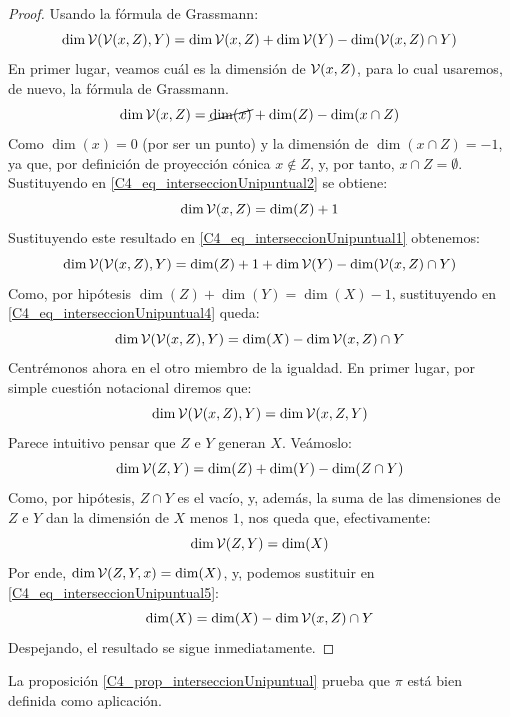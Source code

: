 \begin{proof}
	Usando la fórmula de Grassmann:
	\begin{equation}
		\label{C4_eq_interseccionUnipuntual1}
		\dim\mathcal{V}(\mathcal{V}(x,Z),Y)=\dim\mathcal{V}(x,Z)+\dim\mathcal{V}(Y)-\dim(\mathcal{V}(x,Z)\cap Y)
	\end{equation}
	En primer lugar, veamos cuál es la dimensión de $\mathcal{V}(x,Z)$, para lo cual usaremos, de nuevo, la fórmula de Grassmann.
	\begin{equation}
		\label{C4_eq_interseccionUnipuntual2}
		\dim\mathcal{V}(x,Z)=\cancel{\dim(x)}+\dim(Z)-\dim(x\cap Z)
	\end{equation}
	Como $\dim(x)=0$ (por ser un punto) y la dimensión de $\dim(x\cap Z)=-1$, ya que, por definición de proyección cónica $x\not\in Z$, y, por tanto, $x\cap Z=\emptyset$. Sustituyendo en \eqref{C4_eq_interseccionUnipuntual2} se obtiene:
	\begin{equation}
		\label{C4_eq_interseccionUnipuntual3}
		\dim\mathcal{V}(x,Z)=\dim(Z)+1
	\end{equation}
	Sustituyendo este resultado en \eqref{C4_eq_interseccionUnipuntual1} obtenemos:
	\begin{equation}
		\label{C4_eq_interseccionUnipuntual4}
		\dim\mathcal{V}(\mathcal{V}(x,Z),Y)=\dim(Z)+1+\dim\mathcal{V}(Y)-\dim(\mathcal{V}(x,Z)\cap Y)
	\end{equation}
	Como, por hipótesis $\dim(Z)+\dim(Y)=\dim(X)-1$, sustituyendo en \eqref{C4_eq_interseccionUnipuntual4} queda:
	\begin{equation}
		\label{C4_eq_interseccionUnipuntual5}
		\dim\mathcal{V}(\mathcal{V}(x,Z),Y)=\dim(X)-\dim\mathcal{V}(x,Z)\cap Y
	\end{equation}
	Centrémonos ahora en el otro miembro de la igualdad. En primer lugar, por simple cuestión notacional diremos que:
	\[\dim\mathcal{V}(\mathcal{V}(x,Z),Y)=\dim\mathcal{V}(x,Z,Y)\]
	Parece intuitivo pensar que $Z$ e $Y$ generan $X$. Veámoslo:
	\begin{equation}
		\label{C4_eq_interseccionUnipuntual6}
		\dim\mathcal{V}(Z,Y)=\dim(Z)+\dim(Y)-\dim(Z\cap Y)
	\end{equation}
	Como, por hipótesis, $Z\cap Y$ es el vacío, y, además, la suma de las dimensiones de $Z$ e $Y$ dan la dimensión de $X$ menos $1$, nos queda que, efectivamente:
	\begin{equation}
		\label{C4_eq_interseccionUnipuntual7}
		\dim\mathcal{V}(Z,Y)=\dim(X)
	\end{equation}
	Por ende, $\dim\mathcal{V}(Z,Y,x)=\dim(X)$, y, podemos sustituir en \eqref{C4_eq_interseccionUnipuntual5}:
	\begin{equation}
		\label{C4_eq_interseccionUnipuntual8}
		\dim(X)=\dim(X)-\dim\mathcal{V}(x,Z)\cap Y
	\end{equation}
	Despejando, el resultado se sigue inmediatamente.
\end{proof}
La proposición \ref{C4_prop_interseccionUnipuntual} prueba que $\pi$ está bien definida como aplicación.

